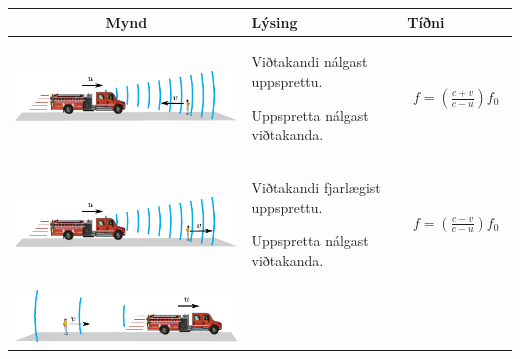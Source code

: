 \begin{table}[h!]
  \centering
  \begin{tabular}{ | c | m{5.2cm} | m{2.5cm} | }
    \hline
    \textbf{Mynd} & \hspace{1.9cm} \textbf{Lýsing} & \hspace{0.4cm} \textbf{Tíðni} \\ \hline
    \begin{minipage}{.4\textwidth}
    \vspace{0.3cm}
    \centering
      \includegraphics[width=0.95\linewidth]{figures/doppler-tilvik1.pdf}
    \vspace{0.3cm}
    \end{minipage}
    &
      Viðtakandi nálgast uppsprettu. \par Uppspretta nálgast viðtakanda.
    & 
      \begin{align*}
          f = \left( \frac{c + v}{c - u} \right)f_0
      \end{align*}
    \\ \hline
    \begin{minipage}{.4\textwidth}
    \vspace{0.3cm}
    \centering
      \includegraphics[width=0.95\linewidth]{figures/doppler-tilvik12.pdf}
    \vspace{0.3cm}
    \end{minipage}
    &
          Viðtakandi fjarlægist uppsprettu. \par Uppspretta nálgast viðtakanda.
    & 
      \begin{align*}
          f = \left( \frac{c - v}{c - u} \right)f_0
      \end{align*}
    \\ \hline
    \begin{minipage}{.4\textwidth}
    \vspace{0.3cm}
    \centering
      \includegraphics[width=0.95\linewidth]{figures/doppler-tilvik3.pdf}

\end{minipage}
\end{tabular}
\end{table}
